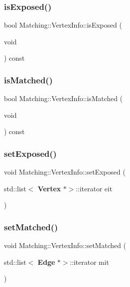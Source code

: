 \subsubsection{is\+Exposed()}
{\footnotesize\ttfamily bool Matching\+::\+Vertex\+Info\+::is\+Exposed (\begin{DoxyParamCaption}\item[{void}]{ }\end{DoxyParamCaption}) const\hspace{0.3cm}{\ttfamily [inline]}}

\mbox{\label{classMatching_1_1VertexInfo_a2984ee21696a4a1840d7d0e6c13f9c54}} 
\subsubsection{is\+Matched()}
{\footnotesize\ttfamily bool Matching\+::\+Vertex\+Info\+::is\+Matched (\begin{DoxyParamCaption}\item[{void}]{ }\end{DoxyParamCaption}) const\hspace{0.3cm}{\ttfamily [inline]}}

\mbox{\label{classMatching_1_1VertexInfo_aed72c93e4a869dab801f69b3492f5bd7}} 
\subsubsection{set\+Exposed()}
{\footnotesize\ttfamily void Matching\+::\+Vertex\+Info\+::set\+Exposed (\begin{DoxyParamCaption}\item[{std\+::list$<$ \textbf{ Vertex} $\ast$$>$\+::iterator}]{eit }\end{DoxyParamCaption})\hspace{0.3cm}{\ttfamily [inline]}}

\mbox{\label{classMatching_1_1VertexInfo_ad39ce51377ac86546ff0b1f6cb62b3ee}} 
\subsubsection{set\+Matched()}
{\footnotesize\ttfamily void Matching\+::\+Vertex\+Info\+::set\+Matched (\begin{DoxyParamCaption}\item[{std\+::list$<$ \textbf{ Edge} $\ast$$>$\+::iterator}]{mit }\end{DoxyParamCaption})\hspace{0.3cm}{\ttfamily [inline]}}



